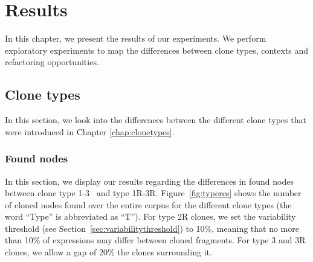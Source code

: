 \chapter{Results}\label{ch:results}
In this chapter, we present the results of our experiments. We perform exploratory experiments to map the differences between clone types, contexts and refactoring opportunities.

\section{Clone types}\label{sec:clonetypeexperiments}
In this section, we look into the differences between the different clone types that were introduced in Chapter \ref{chap:clonetypes}.

\subsection{Found nodes}
In this section, we display our results regarding the differences in found nodes between clone type 1-3~\cite{roy2007survey} and type 1R-3R. Figure~\ref{fig:typeres} shows the number of cloned nodes found over the entire corpus for the different clone types (the word ``Type'' is abbreviated as ``T''). For type 2R clones, we set the variability threshold (see Section~\ref{sec:variabilitythreshold}) to 10\%, meaning that no more than 10\% of expressions may differ between cloned fragments. For type 3 and 3R clones, we allow a gap of 20\% the clones surrounding it.

